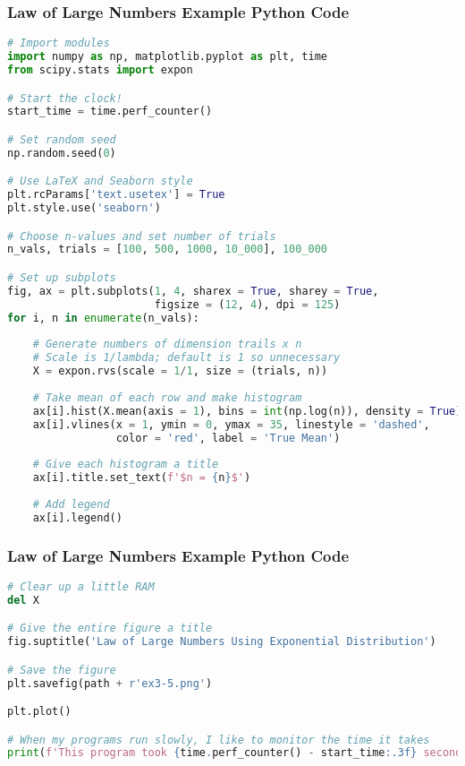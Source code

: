 \documentclass{beamer}
\begin{document}
\begin{frame}[fragile]
\frametitle{Law of Large Numbers Example Python Code}

\begin{lstlisting}[language=Python]
# Import modules
import numpy as np, matplotlib.pyplot as plt, time
from scipy.stats import expon

# Start the clock!
start_time = time.perf_counter()

# Set random seed
np.random.seed(0)

# Use LaTeX and Seaborn style
plt.rcParams['text.usetex'] = True
plt.style.use('seaborn')

# Choose n-values and set number of trials
n_vals, trials = [100, 500, 1000, 10_000], 100_000

# Set up subplots
fig, ax = plt.subplots(1, 4, sharex = True, sharey = True, 
                       figsize = (12, 4), dpi = 125)
for i, n in enumerate(n_vals):
    
    # Generate numbers of dimension trails x n
    # Scale is 1/lambda; default is 1 so unnecessary
    X = expon.rvs(scale = 1/1, size = (trials, n))
         
    # Take mean of each row and make histogram
    ax[i].hist(X.mean(axis = 1), bins = int(np.log(n)), density = True)
    ax[i].vlines(x = 1, ymin = 0, ymax = 35, linestyle = 'dashed', 
                 color = 'red', label = 'True Mean')
    
    # Give each histogram a title
    ax[i].title.set_text(f'$n = {n}$')
    
    # Add legend
    ax[i].legend()
\end{lstlisting}
\end{frame}

\begin{frame}[fragile]
\frametitle{Law of Large Numbers Example Python Code}

\begin{lstlisting}[language=Python]
# Clear up a little RAM
del X

# Give the entire figure a title
fig.suptitle('Law of Large Numbers Using Exponential Distribution')

# Save the figure
plt.savefig(path + r'ex3-5.png')

plt.plot()

# When my programs run slowly, I like to monitor the time it takes
print(f'This program took {time.perf_counter() - start_time:.3f} seconds.')
\end{lstlisting}
\end{frame}
\end{document}
